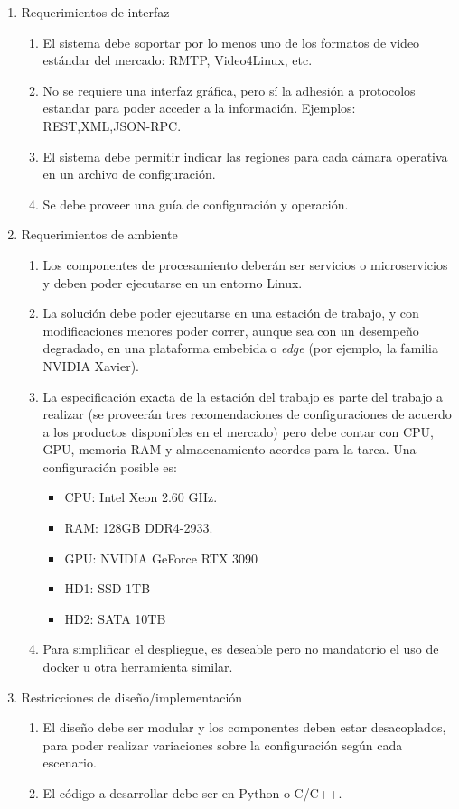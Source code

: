 \documentclass[11pt]{charter}
\begin{document}
\begin{enumerate}
\begin{enumerate}
	\end{enumerate}
\item Requerimientos de interfaz
	\begin{enumerate}
	\item El sistema debe soportar por lo menos uno de los formatos de video estándar del mercado: RMTP, Video4Linux, etc.
	\item No se requiere una interfaz gráfica, pero sí la adhesión a protocolos estandar para poder acceder a la información. Ejemplos: REST,XML,JSON-RPC. 
	\item El sistema debe permitir indicar las regiones para cada cámara operativa en un archivo de configuración.
	\item Se debe proveer una guía de configuración y operación.
	\end{enumerate}	
\item Requerimientos de ambiente
	\begin{enumerate}
	\item Los componentes de procesamiento deberán ser servicios o microservicios y deben poder ejecutarse en un entorno Linux.
	\item La solución debe poder ejecutarse en una estación de trabajo, y con modificaciones menores poder correr, aunque sea con un desempeño degradado, en una plataforma embebida o {\em edge} (por ejemplo, la familia NVIDIA Xavier).
	\item La especificación exacta de la estación del trabajo es parte del trabajo a realizar (se proveerán tres recomendaciones de configuraciones de acuerdo a los productos disponibles en el mercado) pero debe contar con CPU, GPU, memoria RAM y almacenamiento acordes para la tarea. Una configuración posible es:
	\begin{itemize}
		\item CPU: Intel Xeon 2.60 GHz.
		\item RAM: 128GB  DDR4-2933.
		\item GPU: NVIDIA GeForce RTX 3090
		\item HD1: SSD 1TB
		\item HD2: SATA 10TB
	\end{itemize}
	\item Para simplificar el despliegue, es deseable pero no mandatorio el uso de docker u otra herramienta similar.
	\end{enumerate}		
\item Restricciones de diseño/implementación
	\begin{enumerate}
	\item El diseño debe ser modular y los componentes deben estar desacoplados, para poder realizar variaciones sobre la configuración según cada escenario.
	\item El código a desarrollar debe ser en Python o C/C++.
	\end{enumerate}	
\end{enumerate}
\end{document}
